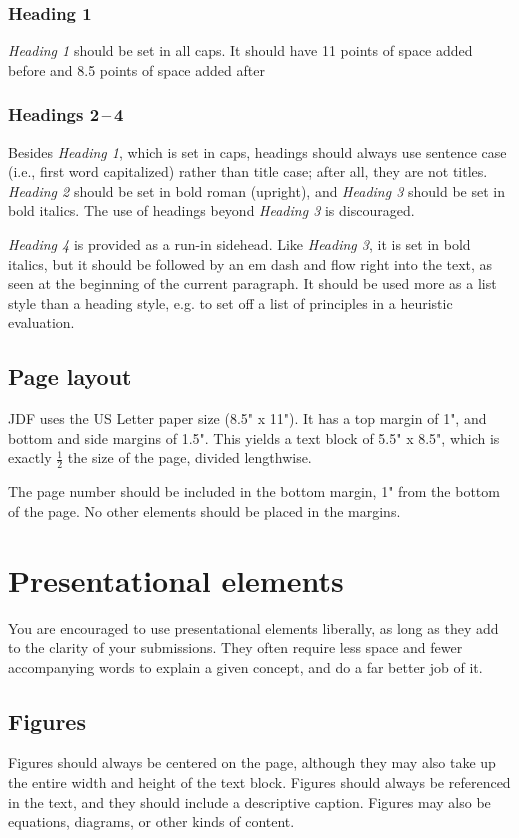\documentclass[
	letterpaper, %
]{jdf}
\begin{document}
\subsubsection{Heading 1}
\emph{Heading 1} should be set in all caps. It should have 11 points of space added before and 8.5 points of space added after

\subsubsection{Headings 2\,–\,4}
Besides \emph{Heading 1}, which is set in caps, headings should always use sentence case (i.e., first word capitalized) rather than title case; after all, they are not titles. 
\emph{Heading 2} should be set in bold roman (upright), and \emph{Heading 3} should be set in bold italics. The use of headings beyond \emph{Heading 3} is discouraged.

\emph{Heading 4} is provided as a run-in sidehead. Like \emph{Heading 3}, it is set in bold italics, but it should be followed by an em dash and flow right into the text, 
as seen at the beginning of the current paragraph. It should be used more as a list style than a heading style, e.g. to set off a list of principles in a heuristic evaluation.

\subsection{Page layout}
JDF uses the US Letter paper size (8.5" x 11"). It has a top margin of 1", and bottom and side margins of 1.5". This yields a text block of 5.5" x 8.5", which is 
exactly \(\frac{1}{2}\) the size of the page, divided lengthwise.

The page number should be included in the bottom margin, 1" from the bottom of the page. No other elements should be placed in the margins.

\section{Presentational elements}
You are encouraged to use presentational elements liberally, as long as they add to the clarity of your submissions. They often require less space and fewer accompanying 
words to explain a given concept, and do a far better job of it.

\subsection{Figures}
Figures should always be centered on the page, although they may also take up the entire width and height of the text block. Figures should always be referenced in the text, 
and they should include a descriptive caption. Figures may also be equations, diagrams, or other kinds of content.
\end{document}
